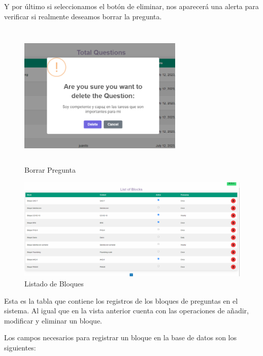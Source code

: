 Y por último si seleccionamos el botón de eliminar, nos aparecerá una alerta para verificar si realmente deseamos borrar la pregunta. \vspace{1cm}

\begin{figure}[!ht]
    \centering
    \includegraphics[width=0.7\textwidth, height=7cm]{imagenes/delete_pregunta.png}
    \caption{ Borrar Pregunta}
    \label{fig:enter-label}
\end{figure}\vspace{3cm}


\begin{figure}[!ht]
    \centering
    \includegraphics[width=1\textwidth]{imagenes/list_bloques.png}
    \caption{Listado de Bloques}
    \label{fig:enter-label}
\end{figure}\vspace{3cm}

Esta es la tabla que contiene los registros de los bloques de preguntas en el sistema. Al igual que en la vista anterior cuenta con las operaciones de añadir, modificar y eliminar un bloque. \vspace{0.3cm}

Los campos necesarios para registrar un bloque en la base de datos son los siguientes: \vspace{0.3cm}

